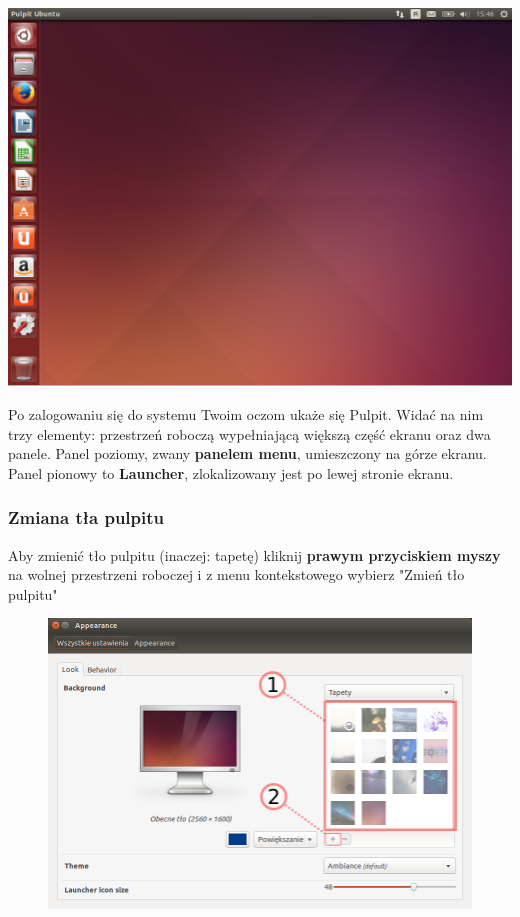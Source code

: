 \begin{center}
	\includegraphics[scale=0.4]{images/unity_desktop.png}
\end{center}

Po zalogowaniu się do systemu Twoim oczom ukaże się Pulpit. Widać na nim trzy elementy: przestrzeń roboczą wypełniającą większą część ekranu oraz dwa panele. Panel poziomy, zwany \textbf{panelem menu}, umieszczony na górze ekranu. Panel pionowy to \textbf{Launcher}, zlokalizowany jest po lewej stronie ekranu.
\clearpage

\subsubsection{Zmiana tła pulpitu}
Aby zmienić tło pulpitu (inaczej: tapetę) kliknij \textbf{prawym przyciskiem myszy} na wolnej przestrzeni roboczej i z menu kontekstowego wybierz "Zmień tło pulpitu"

\begin{figure}
                \includegraphics[width=\linewidth]{images/unity_zmiana_tapety.png}
\end{figure}

